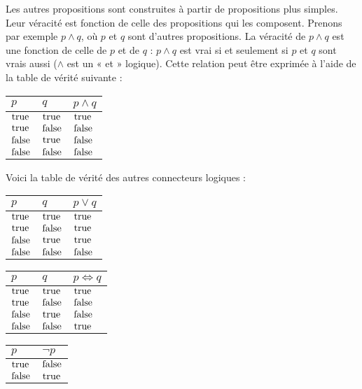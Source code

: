 Les autres propositions sont construites à partir de propositions plus
simples. Leur véracité est fonction de celle des propositions qui les
composent. Prenons par exemple $p \land q$, où $p$ et $q$ sont d’autres
propositions. La véracité de $p \land q$ est une fonction de celle de $p$ et
de $q$ : $p \land q$ est vrai si et seulement si $p$ et $q$ sont vrais aussi
($\land$ est un « et » logique). Cette relation peut être exprimée à l’aide
de la table de vérité suivante :

\vspace{2 mm}
\begin{tabular}{ll|l}
  $p$ & $q$ & $p \land q$ \\
  \hline

  $\mathrm{true}$ & $\mathrm{true}$ & $\mathrm{true}$ \\
  $\mathrm{true}$ & $\mathrm{false}$ & $\mathrm{false}$ \\
  $\mathrm{false}$ & $\mathrm{true}$ & $\mathrm{false}$ \\
  $\mathrm{false}$ & $\mathrm{false}$ & $\mathrm{false}$
\end{tabular}

\vspace{2 mm}
Voici la table de vérité des autres connecteurs logiques :
\vspace{2 mm}

\begin{tabular}{ll|l}
  $p$ & $q$ & $p \lor q$ \\
  \hline

  $\mathrm{true}$ & $\mathrm{true}$ & $\mathrm{true}$ \\
  $\mathrm{true}$ & $\mathrm{false}$ & $\mathrm{true}$ \\
  $\mathrm{false}$ & $\mathrm{true}$ & $\mathrm{true}$ \\
  $\mathrm{false}$ & $\mathrm{false}$ & $\mathrm{false}$
\end{tabular}
\vspace{2 mm}

\begin{tabular}{ll|l}
  $p$ & $q$ & $p \Leftrightarrow q$ \\
  \hline

  $\mathrm{true}$ & $\mathrm{true}$ & $\mathrm{true}$ \\
  $\mathrm{true}$ & $\mathrm{false}$ & $\mathrm{false}$ \\
  $\mathrm{false}$ & $\mathrm{true}$ & $\mathrm{false}$ \\
  $\mathrm{false}$ & $\mathrm{false}$ & $\mathrm{true}$
\end{tabular}
\vspace{2 mm}

\begin{tabular}{l|l}
  $p$ & $\lnot p$ \\
  \hline

  $\mathrm{true}$ & $\mathrm{false}$ \\
  $\mathrm{false}$ & $\mathrm{true}$
\end{tabular}
\vspace{2 mm}

